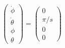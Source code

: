 \begin{equation}
    \begin{split}
        \begin{pmatrix}
            \dot \phi\\
            \dot \theta\\
            \phi\\
            \theta
        \end{pmatrix} = \begin{pmatrix}
            0\\
            \pi /s\\
            0\\
            0
        \end{pmatrix}
    \end{split}
\end{equation}

